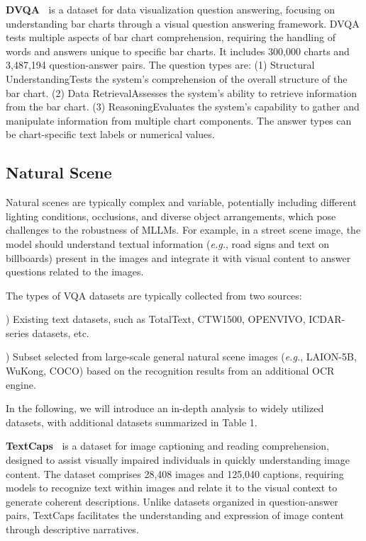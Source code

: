 \noindent \textbf{DVQA~\cite{kafle2018dvqa}} is a dataset for data visualization question answering, focusing on understanding bar charts through a visual question answering framework. DVQA tests multiple aspects of bar chart comprehension, requiring the handling of words and answers unique to specific bar charts. It includes 300,000 charts and 3,487,194 question-answer pairs. The question types are: (1) Structural Understanding\textemdash Tests the system’s comprehension of the overall structure of the bar chart. (2) Data Retrieval\textemdash Assesses the system’s ability to retrieve information from the bar chart. (3) Reasoning\textemdash Evaluates the system’s capability to gather and manipulate information from multiple chart components. The answer types can be chart-specific text labels or numerical values.

\subsection{Natural Scene} 
Natural scenes are typically complex and variable, potentially including different lighting conditions, occlusions, and diverse object arrangements, which pose challenges to the robustness of MLLMs. For example, in a street scene image, the model should understand textual information (\emph{e.g.}, road signs and text on billboards) present in the images and integrate it with visual content to answer questions related to the images.

The types of VQA datasets are typically collected from two sources:

) Existing text datasets, such as TotalText, CTW1500, OPENVIVO, ICDAR-series datasets, etc.

) Subset selected from large-scale general natural scene images (\emph{e.g.}, LAION-5B, WuKong, COCO) based on the recognition results from an additional OCR engine.

In the following, we will introduce an in-depth analysis to 
 widely utilized datasets, with additional datasets summarized in Table 1.

\noindent \textbf{TextCaps~\cite{sidorov2020textcaps}} is a dataset for image captioning and reading comprehension, designed to assist visually impaired individuals in quickly understanding image content. The dataset comprises 28,408 images and 125,040 captions, requiring models to recognize text within images and relate it to the visual context to generate coherent descriptions. Unlike datasets organized in question-answer pairs, TextCaps facilitates the understanding and expression of image content through descriptive narratives.

